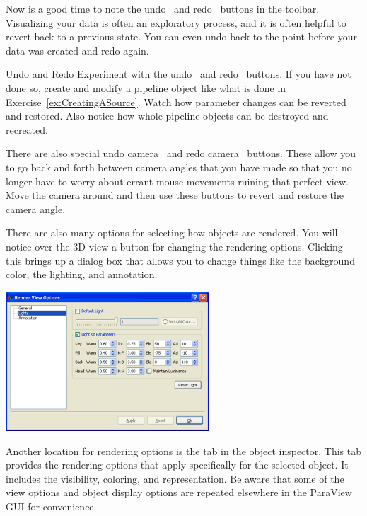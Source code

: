 Now is a good time to note the undo~ and
redo~ buttons in the toolbar.  Visualizing your data is
often an exploratory process, and it is often helpful to revert back to a
previous state.  You can even undo back to the point before your data was
created and redo again.

\begin{exercise}{Undo and Redo}
  \label{ex:UndoAndRedo}%
  Experiment with the undo~ and redo~
  buttons.  If you have not done so, create and modify a pipeline object
  like what is done in Exercise~\ref{ex:CreatingASource}.  Watch how
  parameter changes can be reverted and restored.  Also notice how whole
  pipeline objects can be destroyed and recreated.

  There are also special undo camera~ and redo
  camera~ buttons.  These allow you to go back and
  forth between camera angles that you have made so that you no longer have
  to worry about errant mouse movements ruining that perfect view.  Move
  the camera around and then use these buttons to revert and restore the
  camera angle.
\end{exercise}

There are also many options for selecting how objects are rendered.  You
will notice over the 3D view a  button for changing the
rendering options.  Clicking this brings up a dialog box that allows you to
change things like the background color, the lighting, and annotation.

\begin{inlinefig}
  \includegraphics[width=3in]{images/RenderViewOptions}
\end{inlinefig}

Another location for rendering options is the  tab in the
object inspector.  This tab provides the rendering options that apply
specifically for the selected object.  It includes the visibility,
coloring, and representation.  Be aware that some of the view options and
object display options are repeated elsewhere in the ParaView GUI for
convenience.

